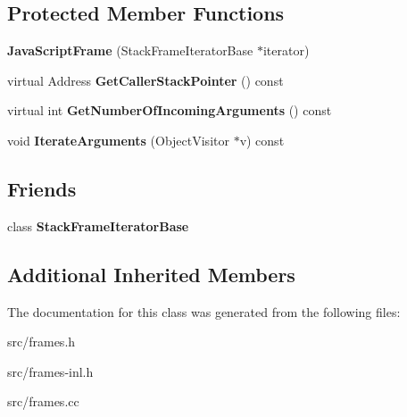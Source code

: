\subsection*{Protected Member Functions}
\begin{DoxyCompactItemize}
\item 
\hypertarget{classv8_1_1internal_1_1_java_script_frame_a75cddddb27dcc0eb6db3cddd6629d531}{}{\bfseries Java\+Script\+Frame} (Stack\+Frame\+Iterator\+Base $\ast$iterator)\label{classv8_1_1internal_1_1_java_script_frame_a75cddddb27dcc0eb6db3cddd6629d531}

\item 
\hypertarget{classv8_1_1internal_1_1_java_script_frame_aa3f3653f6da1b4d41dc75c07cc2a0a47}{}virtual Address {\bfseries Get\+Caller\+Stack\+Pointer} () const \label{classv8_1_1internal_1_1_java_script_frame_aa3f3653f6da1b4d41dc75c07cc2a0a47}

\item 
\hypertarget{classv8_1_1internal_1_1_java_script_frame_af210a9b1bc5bcab62337142fa8bd2e90}{}virtual int {\bfseries Get\+Number\+Of\+Incoming\+Arguments} () const \label{classv8_1_1internal_1_1_java_script_frame_af210a9b1bc5bcab62337142fa8bd2e90}

\item 
\hypertarget{classv8_1_1internal_1_1_java_script_frame_a15101a982a09e31085e338f7e8c6352c}{}void {\bfseries Iterate\+Arguments} (Object\+Visitor $\ast$v) const \label{classv8_1_1internal_1_1_java_script_frame_a15101a982a09e31085e338f7e8c6352c}

\end{DoxyCompactItemize}
\subsection*{Friends}
\begin{DoxyCompactItemize}
\item 
\hypertarget{classv8_1_1internal_1_1_java_script_frame_ac7310421866976ca454bbe11c5f926c3}{}class {\bfseries Stack\+Frame\+Iterator\+Base}\label{classv8_1_1internal_1_1_java_script_frame_ac7310421866976ca454bbe11c5f926c3}

\end{DoxyCompactItemize}
\subsection*{Additional Inherited Members}


The documentation for this class was generated from the following files\+:\begin{DoxyCompactItemize}
\item 
src/frames.\+h\item 
src/frames-\/inl.\+h\item 
src/frames.\+cc\end{DoxyCompactItemize}

